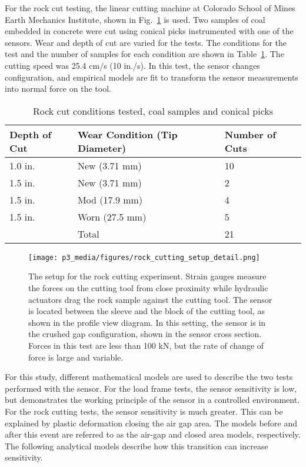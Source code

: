 For the rock cut testing, the linear cutting machine at Colorado School of Mines
Earth Mechanics Institute, shown in Fig.~\ref{fig:lcm} is used. 
Two samples of coal embedded in concrete were cut 
using conical picks instrumented with one of the sensors.
Wear and depth of cut are varied for the tests.
The conditions for the test and the number of samples for each condition are shown in Table~\ref{tab:data}.
The cutting speed was 25.4 cm/s (10 in./s).
In this test, the sensor changes configuration,
and empirical models are fit to transform the sensor measurements into 
normal force on the tool.

\begin{table}[]
\centering
\caption{Rock cut conditions tested, coal samples and conical picks}
\label{tab:data}
\begin{tabular}{|l|l|l|}
\hline
Depth of Cut             & Wear Condition (Tip Diameter) & Number of Cuts \\ \hline
1.0 in.                  & New (3.71 mm)  & 10             \\ \hline
1.5 in.                  & New (3.71 mm)  & 2              \\ \hline
1.5 in.                  & Mod (17.9 mm)  & 4              \\ \hline
1.5 in.                  & Worn (27.5 mm) & 5              \\ \hline
 & Total & 21 \\ \hline
\end{tabular}
\end{table}

\begin{figure}
\centering
\texttt{[image: p3\_media/figures/rock\_cutting\_setup\_detail.png]}
\caption{The setup for the rock cutting experiment. Strain gauges measure the forces on the cutting tool from
close proximity while hydraulic actuators drag the rock sample against the cutting tool. The sensor is 
located between the sleeve and the block of the cutting tool, as shown in the profile view diagram.
In this setting, the sensor is in the crushed gap configuration, shown in the sensor cross section.
Forces in this test are less than 100 kN, but the rate of change of force is large and variable.}
\label{fig:lcm}
\end{figure}

For this study, different mathematical models are used to describe the 
two tests performed with the sensor.
For the load frame tests, the sensor sensitivity is low, but demonstrates
the working principle of the sensor in a controlled environment.
For the rock cutting tests, the sensor sensitivity is much greater.
This can be explained by plastic deformation closing the air gap area. 
The models before and after this event are referred to as the 
air-gap and closed area models, respectively.
The following analytical models describe how this
transition can increase sensitivity.

